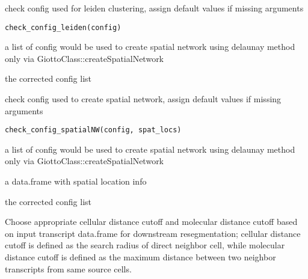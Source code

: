 \documentclass[letterpaper]{book}
\begin{document}
%
\begin{Description}
check config used for leiden clustering, assign default values if missing arguments
\end{Description}
%
\begin{Usage}
\begin{verbatim}
check_config_leiden(config)
\end{verbatim}
\end{Usage}
%
\begin{Arguments}
\begin{ldescription}
\item[\code{config}] a list of config would be used to create spatial network using delaunay method only via GiottoClass::createSpatialNetwork
\end{ldescription}
\end{Arguments}
%
\begin{Value}
the corrected config list
\end{Value}
%
\begin{Description}
check config used to create spatial network, assign default values if missing arguments
\end{Description}
%
\begin{Usage}
\begin{verbatim}
check_config_spatialNW(config, spat_locs)
\end{verbatim}
\end{Usage}
%
\begin{Arguments}
\begin{ldescription}
\item[\code{config}] a list of config would be used to create spatial network using delaunay method only via GiottoClass::createSpatialNetwork

\item[\code{spat\_locs}] a data.frame with spatial location info
\end{ldescription}
\end{Arguments}
%
\begin{Value}
the corrected config list
\end{Value}
%
\begin{Description}
Choose appropriate cellular distance cutoff and molecular distance cutoff based on input transcript data.frame for downstream resegmentation; cellular distance cutoff is defined as the search radius of direct neighbor cell, while molecular distance cutoff is defined as the maximum distance between two neighbor transcripts from same source cells.
\end{Description}
\end{document}
